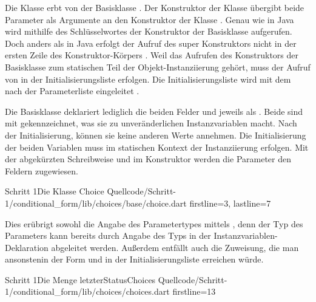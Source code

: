 Die Klasse  erbt von der Basisklasse  . Der Konstruktor der Klasse  übergibt beide Parameter als Argumente an den Konstruktor der Klasse . Genau wie in Java wird mithilfe des Schlüsselwortes  der Konstruktor der Basisklasse aufgerufen. Doch anders als in Java erfolgt der Aufruf des super Konstruktors nicht in der ersten Zeile des Konstruktor-Körpers . Weil das Aufrufen des Konstruktors der Basisklasse zum statischen Teil der Objekt-Instanziierung gehört, muss der Aufruf von  in der Initialisierungsliste erfolgen. Die Initialisierungsliste wird mit dem \IC{:} nach der Parameterliste eingeleitet .

Die Basisklasse  \Lst{\ref{lst:Schritt1KlasseChoice}} deklariert lediglich die beiden Felder  und  jeweils als  . Beide sind mit  gekennzeichnet, was sie zu unveränderlichen Instanzvariablen macht. Nach der Initialisierung, können sie keine anderen Werte annehmen.  Die Initialisierung der beiden Variablen muss im statischen Kontext der Instanziierung erfolgen. Mit der abgekürzten Schreibweise  und   im Konstruktor  werden die Parameter den Feldern zugewiesen.

\begin{alexlisting}{Schritt 1}{Die Klasse Choice}
  {Quellcode/Schritt-1/conditional_form/lib/choices/base/choice.dart}
  {firstline=3, lastline=7}
  \label{lst:Schritt1KlasseChoice}
\end{alexlisting}

Dies erübrigt sowohl die Angabe des Parametertypes mittels , denn der Typ des Parameters kann bereits durch Angabe des Typs in der Instanzvariablen-Deklaration abgeleitet werden. Außerdem entfällt auch die Zuweisung, die man ansonstenin der Form  und  in der Initialisierungsliste erreichen würde.


\begin{alexlisting}{Schritt 1}{Die Menge letzterStatusChoices}
  {Quellcode/Schritt-1/conditional_form/lib/choices/choices.dart}
  {firstline=13}
  \label{lst:Schritt1DieMengeLetzterStatusChoices}
\end{alexlisting}

